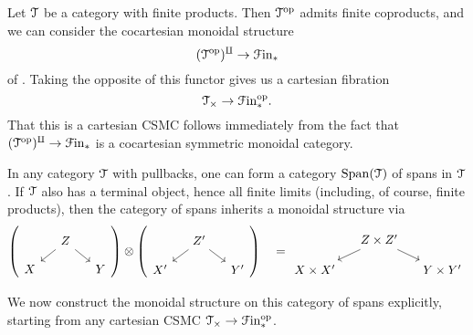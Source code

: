 \documentclass[main.tex]{subfiles}
\begin{document}
\begin{example}
  Let $\mathcal{T}$ be a category with finite products. Then $\mathcal{T}^{\mathrm{op}}$ admits finite coproducts, and we can consider the cocartesian monoidal structure
  \begin{equation*}
    (\mathcal{T}^{\mathrm{op}})^{\amalg} \to \mathcal{F}\mathrm{in}_{*}
  \end{equation*}
  of \cite[Construction~2.4.3.1]{luriehigheralgebra}. Taking the opposite of this functor gives us a cartesian fibration
  \begin{equation*}
    \mathcal{T}_{\times} \to \mathcal{F}\mathrm{in}_{*}^{\mathrm{op}}.
  \end{equation*}
  That this is a cartesian CSMC follows immediately from the fact that $(\mathcal{T}^{\mathrm{op}})^{\amalg} \to \mathcal{F}\mathrm{in}_{*}$ is a cocartesian symmetric monoidal category.
\end{example}


In any category $\mathcal{T}$ with pullbacks, one can form a category $\mathrm{Span}(\mathcal{T})$ of spans in $\mathcal{T}$. If $\mathcal{T}$ also has a terminal object, hence all finite limits (including, of course, finite products), then the category of spans inherits a monoidal structure via
\begin{equation*}
  \left(
  \begin{tikzcd}[row sep=small, column sep=small]
    & Z
    \arrow[dl]
    \arrow[dr]
    \\
    X
    && Y
  \end{tikzcd}
  \right) \otimes \left(
  \begin{tikzcd}[row sep=small, column sep=small]
    & Z'
    \arrow[dl]
    \arrow[dr]
    \\
    X'
    && Y'
  \end{tikzcd}
  \right) \quad =
  \begin{tikzcd}[row sep=small, column sep=small]
    & Z \times Z'
    \arrow[dl]
    \arrow[dr]
    \\
    X \times X'
    && Y \times Y'
  \end{tikzcd}
\end{equation*}

We now construct the monoidal structure on this category of spans explicitly, starting from any cartesian CSMC $\mathcal{T}_{\times} \to \mathcal{F}\mathrm{in}_{*}^{\mathrm{op}}$.
\end{document}
